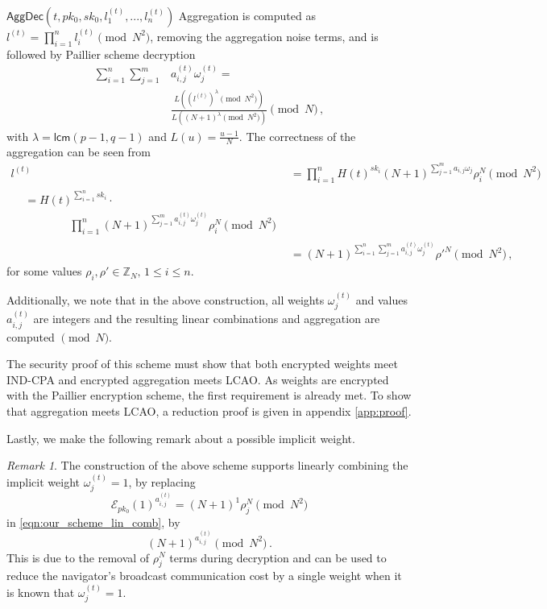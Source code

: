 \documentclass[10pt,letterpaper,oneside,twocolumn,journal]{IEEEtran}
\theoremstyle{definition}
\theoremstyle{definition}
\theoremstyle{remark}
\newtheorem*{remark}{Remark}
\newcommand\shrtdots{\!...}
\begin{document}
\begin{LaTeXdescription}
    \item[$\mathsf{AggDec}(t, pk_0, sk_0, l^{(t)}_1,\shrtdots,l^{(t)}_n)$] Aggregation is computed as $l^{(t)} = \prod^n_{i=1}l^{(t)}_i \pmod{N^2}$, removing the aggregation noise terms, and is followed by Paillier scheme decryption
    \begin{equation}
        \begin{split}
            \sum^{n}_{i=1}\sum^{m}_{j=1}&a^{(t)}_{i,j}\omega^{(t)}_j =\\
            &\frac{L((l^{(t)})^\lambda\pmod{N^2})}{L((N+1)^\lambda\pmod{N^2})} \pmod{N}\,,
        \end{split} \label{eqn:our_scheme_decrypt}
    \end{equation}
    with $\lambda = \mathsf{lcm}(p-1, q-1)$ and $L(u) = \frac{u-1}{N}$. The correctness of the aggregation can be seen from
    \begin{align*}
        l^{(t)} &= \prod^n_{i=1}H(t)^{sk_i}(N+1)^{\sum^{m}_{j=1}a_{i,j}\omega_j}\rho_i^N \pmod{N^2} \\
        \begin{split}
            &= H(t)^{\sum^n_{i=1}sk_i}\cdot \\
            &\qquad\qquad \prod^n_{i=1}(N+1)^{\sum^{m}_{j=1}a^{(t)}_{i,j}\omega^{(t)}_j}\rho_i^N \pmod{N^2}
        \end{split}\\
        &= (N+1)^{\sum^n_{i=1}\sum^{m}_{j=1}a^{(t)}_{i,j}\omega^{(t)}_j}\rho'^N \pmod{N^2}\,,
    \end{align*}
    for some values $\rho_i,\rho' \in \mathbb{Z}_N,\,1\leq i \leq n$.
\end{LaTeXdescription}
Additionally, we note that in the above construction, all weights $\omega^{(t)}_j$ and values $a^{(t)}_{i,j}$ are integers and the resulting linear combinations and aggregation are computed $\pmod{N}$. 

The security proof of this scheme must show that both encrypted weights meet IND-CPA and encrypted aggregation meets LCAO. As weights are encrypted with the Paillier encryption scheme, the first requirement is already met. To show that aggregation meets LCAO, a reduction proof is given in appendix \ref{app:proof}.

Lastly, we make the following remark about a possible implicit weight.
\begin{remark}
    The construction of the above scheme supports linearly combining the implicit weight $\omega^{(t)}_j = 1$, by replacing
    \begin{equation}
        \mathcal{E}_{pk_0}(1)^{a^{(t)}_{i,j}} = (N+1)^{1}\rho_j^N \pmod{N^2}
    \end{equation}
    in \eqref{eqn:our_scheme_lin_comb}, by
    \begin{equation}
        (N+1)^{a^{(t)}_{i,j}} \pmod{N^2}\,.
    \end{equation}
    This is due to the removal of $\rho_j^N$ terms during decryption and can be used to reduce the navigator's broadcast communication cost by a single weight when it is known that $\omega^{(t)}_j=1$.
\end{remark}
\end{document}
